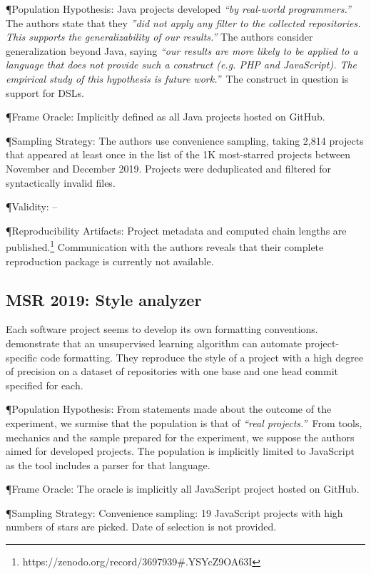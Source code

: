 \documentclass[sigconf,review,anonymous]{acmart}
\newcommand{\gh}{{GitHub}\xspace}
\begin{document}
\P{Population Hypothesis:} Java projects developed {\it ``by real-world
  programmers.''\,} The authors state that they {\it ''did not apply any filter to
  the collected repositories. This supports the generalizability of our
  results.''}
The authors consider generalization beyond Java, saying {\it ``our
  results are more likely to be applied to a language that does not provide such
  a construct (e.g. PHP and JavaScript). The empirical study of this hypothesis
  is future work.''\,} The construct in question is support for DSLs.

\P{Frame Oracle:} Implicitly defined as all Java projects hosted on \gh.

\P{Sampling Strategy:} The authors use convenience sampling, taking 2,814
projects that appeared at least once in the list of the 1K most-starred projects
between November and December 2019. Projects were deduplicated and filtered for
syntactically invalid files.

\P{Validity:} --

\P{Reproducibility Artifacts:} Project metadata and computed chain len\-gths are
published.\footnote{https://zenodo.org/record/3697939\#.YSYcZ9OA63I}
Communication with the authors reveals that their complete reproduction package
is currently not available.

\subsection{MSR 2019: Style analyzer}

Each software project seems to develop its own formatting conventions.
\citet{Markovtsev:2019:MSR} demonstrate that an unsupervised learning algorithm
can automate project-specific code formatting. They reproduce the style of a
project with a high degree of precision on a dataset of repositories with one
base and one head commit specified for each.

\P{Population Hypothesis:} From statements made about the outcome of the
experiment, we surmise that the population is that of {\it ``real projects.''\,}
From tools, mechanics and the sample prepared for the experiment, we suppose the
authors aimed for developed projects. The population is implicitly limited to
JavaScript as the tool includes a parser for that language.

\P{Frame Oracle:} The oracle is implicitly all JavaScript project hosted on \gh.

\P{Sampling Strategy:} Convenience sampling: 19 JavaScript projects with high
numbers of stars are picked. Date of selection is not provided.
\end{document}
